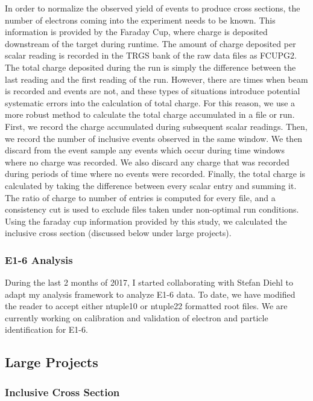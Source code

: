 In order to normalize the observed yield of events to produce cross sections, the number of electrons coming into the experiment needs to be known.  This information is provided by the Faraday Cup, where charge is deposited downstream of the target during runtime.  The amount of charge deposited per scalar reading is recorded in the TRGS bank of the raw data files as FCUPG2.  The total charge deposited during the run is simply the difference between the last reading and the first reading of the run.  However, there are times when beam is recorded and events are not, and these types of situations introduce potential systematic errors into the calculation of total charge.  For this reason, we use a more robust method to calculate the total charge accumulated in a file or run.  First, we record the charge accumulated during subsequent scalar readings.  Then, we record the number of inclusive events observed in the same window.  We then discard from the event sample any events which occur during time windows where no charge was recorded.  We also discard any charge that was recorded during periods of time where no events were recorded.  Finally, the total charge is calculated by taking the difference between every scalar entry and summing it.  The ratio of charge to number of entries is computed for every file, and a consistency cut is used to exclude files taken under non-optimal run conditions.  Using the faraday cup information provided by this study, we calculated the inclusive cross section (discussed below under large projects). 

\subsubsection{E1-6 Analysis}
During the last 2 months of 2017, I started collaborating with Stefan Diehl to adapt my analysis framework to analyze E1-6 data.  To date, we have modified the reader to accept either ntuple10 or ntuple22 formatted root files.  We are currently working on calibration and validation of electron and particle identification for E1-6.   

\subsection{Large Projects}
\subsubsection{Inclusive Cross Section}

